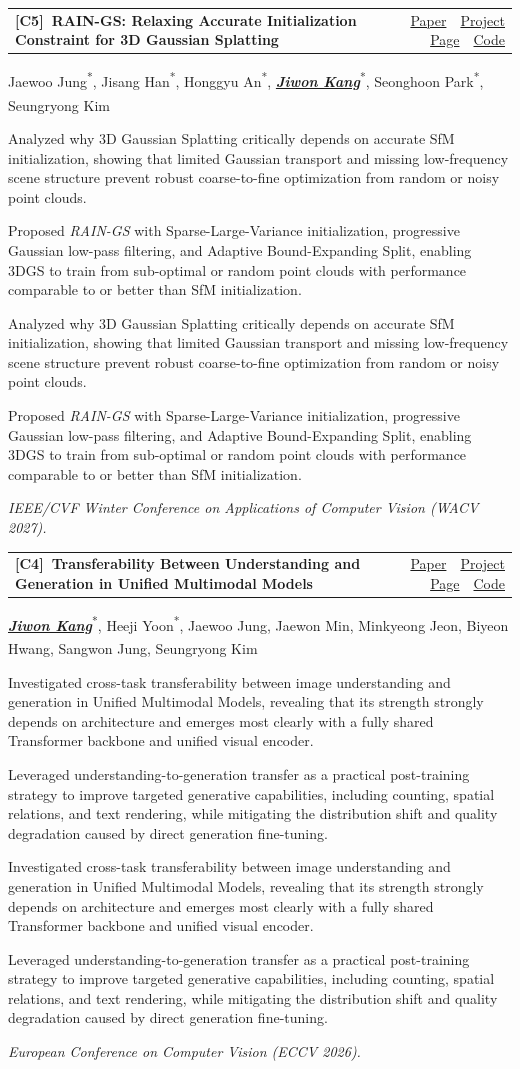 \documentclass[11pt,letterpaper]{article}
\makeatletter
\newcommand{\me}[1]{\textbf{\textit{\uline{#1}}}}   %
\newcommand{\eqc}{\textsuperscript{*}}              %
\newcommand{\corr}{\textsuperscript{\dag}}          %
\newcommand{\publinks}[3]{%
  \small\color{linkblue}%
  \href{#1}{Paper}~\textbar~\href{#2}{Project Page}~\textbar~\href{#3}{Code}%
}
\newcommand{\pubitem}[6]{%
  \begingroup
  \setlength{\parfillskip}{0pt}%
  \noindent\begin{minipage}{\linewidth}%
  \setlength{\tabcolsep}{0pt}%
  \noindent
  \begin{tabularx}{\linewidth}{@{}>{\RaggedRight\arraybackslash}X @{\hspace{1.5em}} r@{}}
    \textbf{#1\ #2} & #3
  \end{tabularx}\par
  #4\par
  \def\pub@desc{#6}%
  \ifx\pub@desc\@empty\else
    \begin{cvbullets}#6\end{cvbullets}%
  \fi
  \textit{#5}\par
  \end{minipage}%
  \par
  \endgroup
}
\makeatother
\begin{document}
\pubitem{[C5]}
  {\label{RAIN-GS}RAIN-GS: Relaxing Accurate Initialization Constraint for 3D Gaussian Splatting}
  {\publinks{https://arxiv.org/abs/2403.09413}{https://cvlab-kaist.github.io/RAIN-GS/}{https://github.com/cvlab-kaist/RAIN-GS}}
  {Jaewoo Jung\eqc, Jisang Han\eqc, Honggyu An\eqc, \me{Jiwon Kang}\eqc, Seonghoon Park\eqc, Seungryong Kim\corr}
  {IEEE/CVF Winter Conference on Applications of Computer Vision (WACV 2027).}
  {\item Analyzed why 3D Gaussian Splatting critically depends on accurate SfM initialization, showing that limited Gaussian transport and missing low-frequency scene structure prevent robust coarse-to-fine optimization from random or noisy point clouds. \item Proposed \textit{RAIN-GS} with Sparse-Large-Variance initialization, progressive Gaussian low-pass filtering, and Adaptive Bound-Expanding Split, enabling 3DGS to train from sub-optimal or random point clouds with performance comparable to or better than SfM initialization.}

\pubitem{[C4]}
  {\label{UMM}Transferability Between Understanding and Generation in Unified Multimodal Models}
  {\publinks{https://arxiv.org/abs/2607.04423}{https://cvlab-kaist.github.io/UMM_Transferability/}{https://github.com/cvlab-kaist/UMM_Transferability}}
  {\me{Jiwon Kang}\eqc, Heeji Yoon\eqc, Jaewoo Jung, Jaewon Min, Minkyeong Jeon, Biyeon Hwang, Sangwon Jung\corr, Seungryong Kim\corr}
  {European Conference on Computer Vision (ECCV 2026).}
  {\item Investigated cross-task transferability between image understanding and generation in Unified Multimodal Models, revealing that its strength strongly depends on architecture and emerges most clearly with a fully shared Transformer backbone and unified visual encoder. \item Leveraged understanding-to-generation transfer as a practical post-training strategy to improve targeted generative capabilities, including counting, spatial relations, and text rendering, while mitigating the distribution shift and quality degradation caused by direct generation fine-tuning.}
\end{document}

